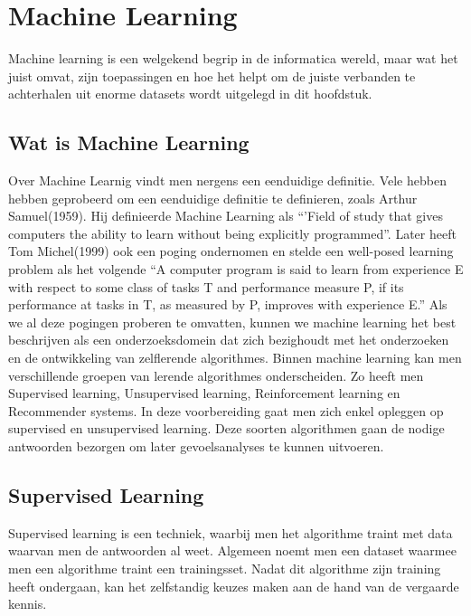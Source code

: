 \section{Machine Learning}\label{Machine Learning}

Machine learning is een welgekend begrip in de informatica wereld, maar wat het juist omvat, zijn toepassingen en hoe het helpt om de juiste verbanden te achterhalen uit enorme datasets wordt uitgelegd in dit hoofdstuk.

\subsection{Wat is Machine Learning}\label{Wat is Machine Learning}

Over Machine Learnig vindt men nergens een eenduidige definitie. Vele hebben hebben geprobeerd om een eenduidige definitie te definieren, zoals Arthur Samuel(1959). Hij definieerde Machine Learning als ``'Field of study that gives computers the ability to learn without being explicitly programmed''. Later heeft Tom Michel(1999) ook een poging ondernomen en stelde een well-posed learning problem als het volgende ``A computer program is said to learn from experience E with respect to some class of tasks T and performance measure P, if its performance at tasks in T, as measured by P, improves with experience E.'' Als we al deze pogingen proberen te omvatten, kunnen we machine learning het best beschrijven als een onderzoeksdomein dat zich bezighoudt met het onderzoeken en de ontwikkeling van zelflerende algorithmes.
\newline
Binnen machine learning kan men verschillende groepen van lerende algorithmes onderscheiden. Zo heeft men Supervised learning, Unsupervised learning, Reinforcement learning en Recommender systems. In deze voorbereiding gaat men zich enkel opleggen op supervised en unsupervised learning. Deze soorten algorithmen gaan de nodige antwoorden bezorgen om later gevoelsanalyses te kunnen uitvoeren.


\subsection{Supervised Learning}\label{Supervised Learning}

Supervised learning is een techniek, waarbij men het algorithme traint met data waarvan men de antwoorden al weet. Algemeen noemt men een dataset waarmee men een algorithme traint een trainingsset. Nadat dit algorithme zijn training heeft ondergaan, kan het zelfstandig keuzes maken aan de hand van de vergaarde kennis.

